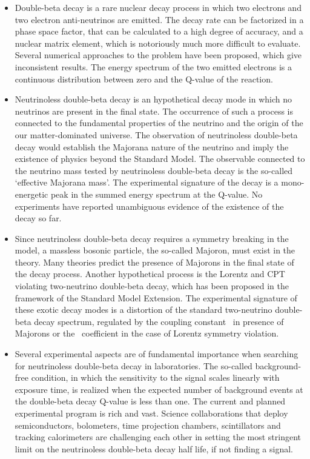 \chapsummary
\begin{itemize}
  \item Double-beta decay is a rare nuclear decay process in which two electrons and two
    electron anti-neutrinos are emitted. The decay rate can be factorized in a phase space
    factor, that can be calculated to a high degree of accuracy, and a nuclear matrix
    element, which is notoriously much more difficult to evaluate. Several numerical
    approaches to the problem have been proposed, which give inconsistent results. The
    energy spectrum of the two emitted electrons is a continuous distribution between zero
    and the Q-value of the reaction.
  \item Neutrinoless double-beta decay is an hypothetical decay mode in which no neutrinos
    are present in the final state. The occurrence of such a process is connected to the
    fundamental properties of the neutrino and the origin of the our matter-dominated
    universe. The observation of neutrinoless double-beta decay would establish the
    Majorana nature of the neutrino and imply the existence of physics beyond the Standard
    Model. The observable connected to the neutrino mass tested by neutrinoless
    double-beta decay is the so-called `effective Majorana mass'. The experimental
    signature of the decay is a mono-energetic peak in the summed energy spectrum at the
    Q-value. No experiments have reported unambiguous evidence of the existence of the
    decay so far.
  \item Since neutrinoless double-beta decay requires a symmetry breaking in the model, a
    massless bosonic particle, the so-called Majoron, must exist in the theory. Many
    theories predict the presence of Majorons in the final state of the decay process.
    Another hypothetical process is the Lorentz and CPT violating two-neutrino double-beta
    decay, which has been proposed in the framework of the Standard Model Extension. The
    experimental signature of these exotic decay modes is a distortion of the standard
    two-neutrino double-beta decay spectrum, regulated by the coupling constant \ga\ in
    presence of Majorons or the \aof\ coefficient in the case of Lorentz symmetry
    violation.
  \item Several experimental aspects are of fundamental importance when searching for
    neutrinoless double-beta decay in laboratories. The so-called background-free
    condition, in which the sensitivity to the signal scales linearly with exposure time,
    is realized when the expected number of background events at the double-beta decay
    Q-value is less than one. The current and planned experimental program is rich
    and vast. Science collaborations that deploy semiconductors, bolometers, time projection
    chambers, scintillators and tracking calorimeters are challenging each other in
    setting the most stringent limit on the neutrinoless double-beta decay half life, if
    not finding a signal.
\end{itemize}

